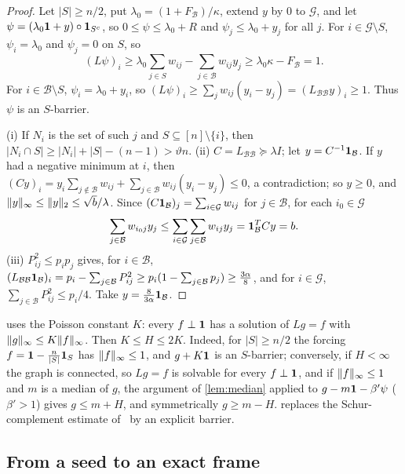 \begin{proof}
Let $|S|\ge n/2$, put $\lambda_0=(1+F_{\mathcal B})/\kappa$, extend $y$ by $0$ to
$\mathcal G$, and let $\psi=(\lambda_0\mathbf 1+y)\circ\mathbf 1_{S^c}$, so
$0\le\psi\le\lambda_0+R$ and $\psi_j\le\lambda_0+y_j$ for all $j$. For
$i\in\mathcal G\setminus S$, $\psi_i=\lambda_0$ and $\psi_j=0$ on $S$, so
\[
 (L\psi)_i\ge\lambda_0\sum_{j\in S}w_{ij}-\sum_{j\in\mathcal B}w_{ij}y_j\ge
 \lambda_0\kappa-F_{\mathcal B}=1 .
\]
For $i\in\mathcal B\setminus S$, $\psi_i=\lambda_0+y_i$, so
$(L\psi)_i\ge\sum_jw_{ij}(y_i-y_j)=(L_{\mathcal B\mathcal B}y)_i\ge1$. Thus $\psi$
is an $S$-barrier.

(i) If $N_i$ is the set of such $j$ and $S\subseteq[n]\setminus\{i\}$, then
$|N_i\cap S|\ge|N_i|+|S|-(n-1)>\vartheta n$.
(ii) $C=L_{\mathcal B\mathcal B}\succeq\lambda I$; let $y=C^{-1}\mathbf 1_{\mathcal B}$. If
$y$ had a negative minimum at $i$, then $(Cy)_i=y_i\sum_{j\notin\mathcal
B}w_{ij}+\sum_{j\in\mathcal B}w_{ij}(y_i-y_j)\le0$, a contradiction; so $y\ge0$,
and $\lVert y\rVert_\infty\le\lVert y\rVert_2\le\sqrt b/\lambda$. Since
$(C\mathbf 1_{\mathcal B})_j=\sum_{i\in\mathcal G}w_{ij}$ for $j\in\mathcal B$, for each
$i_0\in\mathcal G$
\[
 \sum_{j\in\mathcal B}w_{i_0j}y_j\le\sum_{i\in\mathcal G}\sum_{j\in\mathcal B}w_{ij}y_j
 =\mathbf 1_{\mathcal B}^TCy=b .
\]
(iii) $P_{ij}^2\le p_ip_j$ gives, for $i\in\mathcal B$,
$(L_{\mathcal B\mathcal B}\mathbf 1_{\mathcal B})_i=p_i-\sum_{j\in\mathcal B}P_{ij}^2\ge
p_i(1-\sum_{j\in\mathcal B}p_j)\ge\frac{3\alpha}8$, and for $i\in\mathcal G$,
$\sum_{j\in\mathcal B}P_{ij}^2\le p_i/4$. Take $y=\frac8{3\alpha}\mathbf 1_{\mathcal B}$.
\end{proof}

\begin{remark}\label{rem:poisson}
\cite{Orig} uses the Poisson constant $K$: every $f\perp\mathbf 1$ has a solution of
$Lg=f$ with $\lVert g\rVert_\infty\le K\lVert f\rVert_\infty$. Then $K\le H\le2K$. Indeed, for
$|S|\ge n/2$ the forcing $f=\mathbf 1-\frac n{|S|}\mathbf 1_S$ has $\lVert f\rVert_\infty\le1$,
and $g+K\mathbf 1$ is an $S$-barrier; conversely, if $H<\infty$ the graph is connected,
so $Lg=f$ is solvable for every $f\perp\mathbf 1$, and if $\lVert f\rVert_\infty\le1$ and $m$ is
a median of $g$, the argument of \cref{lem:median}
applied to $g-m\mathbf 1-\beta'\psi$ ($\beta'>1$) gives $g\le m+H$, and symmetrically
$g\ge m-H$.  replaces the Schur-complement estimate
of~\cite{Orig} by an explicit barrier.
\end{remark}

\subsection{From a seed to an exact frame}

